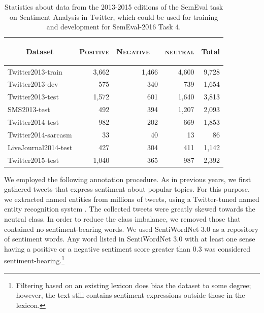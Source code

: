 \documentclass[11pt,letterpaper]{article}
\begin{document}
\begin{table}[ht!]
  \small
  \begin{center}
    \resizebox{\columnwidth}{!} {
    \begin{tabular}{|l|r r r |r|}
      \hline
      \multicolumn{1}{|c|}{\begin{sideways}\bf Dataset\end{sideways}} & \multicolumn{1}{c}{\begin{sideways}\textsc{Positive}\end{sideways}} & \multicolumn{1}{c}{\begin{sideways}\textsc{Negative~~}\end{sideways}} & \multicolumn{1}{c|}{\begin{sideways}\textsc{neutral}\end{sideways}} & \multicolumn{1}{c|}{\begin{sideways}\bf Total\end{sideways}}\\
      \hline
      Twitter2013-train & 3,662 & 1,466 &  4,600 & 9,728\\
      Twitter2013-dev & 575 & 340 &  739 & 1,654\\
      Twitter2013-test  & 1,572 & 601 & 1,640 & 3,813\\
      SMS2013-test  & 492 & 394 & 1,207 & 2,093\\
      Twitter2014-test  & 982 & 202 & 669 & 1,853\\
      \footnotesize{Twitter2014-sarcasm} & 33 & 40 & 13 & 86\\
      \footnotesize{LiveJournal2014-test}  & 427 & 304 & 411 & 1,142\\
      Twitter2015-test & 1,040 & 365 & 987 & 2,392 \\
      \hline
    \end{tabular}
    }
    \caption{Statistics about data from the 2013-2015 editions of the SemEval task on Sentiment Analysis in Twitter, which could be used for training and development for SemEval-2016 Task 4.}
    \label{T:CorpusStatsB:old:editions}
  \end{center}
\end{table}

We employed the following annotation procedure.
As in previous years, we first gathered tweets that express sentiment
about popular topics. For this purpose, we extracted named entities
from millions of tweets, using a Twitter-tuned named entity
recognition system \cite{ner}. The collected tweets were greatly
skewed towards the neutral class. In order to reduce the class
imbalance, we removed those that contained no sentiment-bearing
words. We used SentiWordNet 3.0 \cite{Baccianella:2010fk} as a
repository of sentiment words. Any word listed in SentiWordNet 3.0
with at least one sense having a positive or a negative sentiment
score greater than 0.3 was considered sentiment-bearing.\footnote{Filtering based on an existing lexicon does bias the
dataset to some degree; however, the text still contains
sentiment expressions outside those in the lexicon.}
\end{document}
